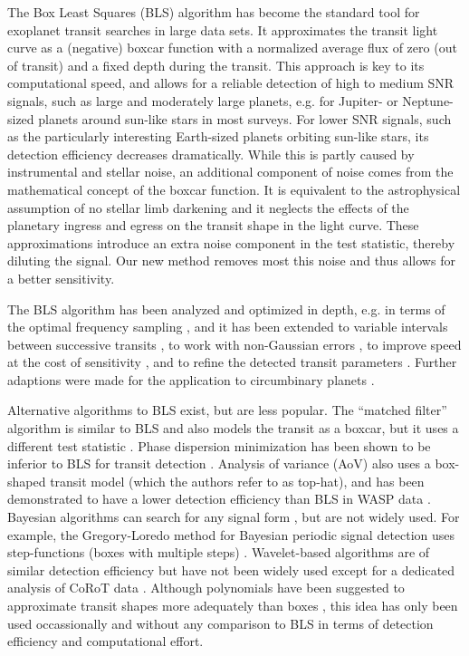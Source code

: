 \documentclass[twocolumn,tighten,longauthor]{myaastex62}
\begin{document}
The Box Least Squares (BLS) algorithm \citep{2002A&A...391..369K,2016ascl.soft07008K} has become the standard tool for exoplanet transit searches in large data sets. It approximates the transit light curve as a (negative) boxcar function with a normalized average flux of zero (out of transit) and a fixed depth during the transit. This approach is key to its computational speed, and allows for a reliable detection of high to medium SNR signals, such as large and moderately large planets, e.g. for Jupiter- or Neptune-sized planets around sun-like stars in most surveys. For lower SNR signals, such as the particularly interesting Earth-sized planets orbiting sun-like stars, its detection efficiency decreases dramatically. While this is partly caused by instrumental and stellar noise, an additional component of noise comes from the mathematical concept of the boxcar function. It is equivalent to the astrophysical assumption of no stellar limb darkening and it neglects the effects of the planetary ingress and egress on the transit shape in the light curve. These approximations introduce an extra noise component in the test statistic, thereby diluting the signal. Our new method removes most this noise and thus allows for a better sensitivity.

The BLS algorithm has been analyzed and optimized in depth, e.g. in terms of the optimal frequency sampling \citep{2014A&A...561A.138O}, and it has been extended to variable intervals between successive transits \citep{2013ApJ...765..132C}, to work with non-Gaussian errors \citep{2014IAUS..293..410B}, to improve speed at the cost of sensitivity \citep{2008A&A...492..617R}, and to refine the detected transit parameters \citep{2006MNRAS.373..799C}. Further adaptions were made for the application to circumbinary planets \citep{2008MNRAS.387.1597O}.

Alternative algorithms to BLS exist, but are less popular. The ``matched filter'' algorithm is similar to BLS and also models the transit as a boxcar, but it uses a different test statistic \citep{1996Icar..119..244J,2007ASPC..366..145B}. Phase dispersion minimization \citep{1978ApJ...224..953S} has been shown to be inferior to BLS for transit detection \citep{2002A&A...391..369K}. Analysis of variance (AoV) \citep{2006MNRAS.365..165S} also uses a box-shaped transit model (which the authors refer to as top-hat), and has been demonstrated to have a lower detection efficiency than BLS in WASP data \citep{2012A&A...548A..48E}. Bayesian algorithms can search for any signal form \citep{2000ApJ...535..338D,2001A&A...365..330D}, but are not widely used. For example, the Gregory-Loredo method for Bayesian periodic signal detection uses step-functions (boxes with multiple steps) \citep{2002A&A...395..625A,2004MNRAS.350..331A}. Wavelet-based algorithms \citep{2007A&A...467.1345R} are of similar detection efficiency but have not been widely used except for a dedicated analysis of CoRoT data \citep{2009IAUS..253..374R}. Although polynomials have been suggested to approximate transit shapes more adequately than boxes \citep{2012A&A...548A..44C}, this idea has only been used occassionally \citep{2016AJ....151..171J,2018AJ....156...78L} and without any comparison to BLS in terms of detection efficiency and computational effort.
\end{document}
